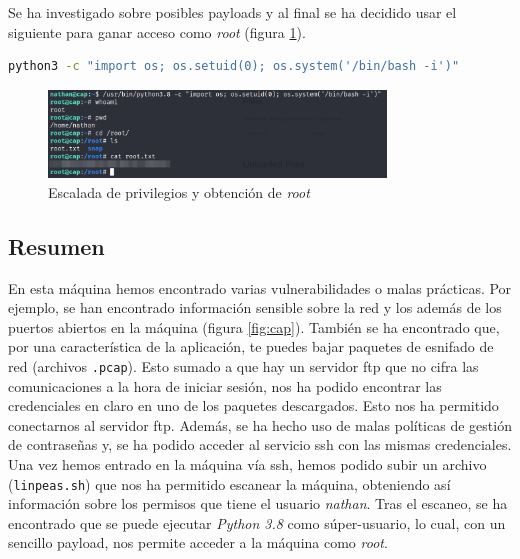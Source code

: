 Se ha investigado sobre posibles payloads y al final se ha decidido usar el siguiente para ganar acceso como \textit{root} (figura \ref{fig:cap-root}).
\begin{lstlisting}[language=bash]
python3 -c "import os; os.setuid(0); os.system('/bin/bash -i')"
\end{lstlisting}

\begin{figure}[h]
    \centering
    \includegraphics[width=0.8\textwidth]{images/machines/cap/root.png}
    \caption{Escalada de privilegios y obtención de \textit{root}}
    \label{fig:cap-root}
\end{figure}

\newpage

\subsection{Resumen}

En esta máquina hemos encontrado varias vulnerabilidades o malas prácticas. Por ejemplo, se han encontrado información sensible sobre la red y los además de los puertos abiertos en la máquina (figura \ref{fig:cap}). También se ha encontrado que, por una característica de la aplicación, te puedes bajar paquetes de esnifado de red (archivos \texttt{.pcap}). Esto sumado a que hay un servidor \acrshort{ftp} que no cifra las comunicaciones a la hora de iniciar sesión, nos ha podido encontrar las credenciales en claro en uno de los paquetes descargados. Esto nos ha permitido conectarnos al servidor \acrshort{ftp}. Además, se ha hecho uso de malas políticas de gestión de contraseñas y, se ha podido acceder al servicio \acrshort{ssh} con las mismas credenciales.\\

Una vez hemos entrado en la máquina vía \acrshort{ssh}, hemos podido subir un archivo (\texttt{linpeas.sh}) que nos ha permitido escanear la máquina, obteniendo así información sobre los permisos que tiene el usuario \textit{nathan}. Tras el escaneo, se ha encontrado que se puede ejecutar \textit{Python 3.8} como súper-usuario, lo cual, con un sencillo payload, nos permite acceder a la máquina como \textit{root}.